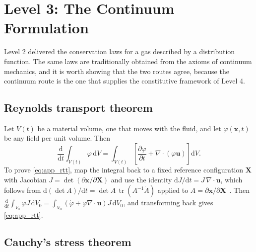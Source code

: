 \section{Level 3: The Continuum Formulation}
\label{app:continuum}

Level 2 delivered the conservation laws for a gas described by a distribution function. The same laws are traditionally obtained from the axioms of continuum mechanics, and it is worth showing that the two routes agree, because the continuum route is the one that supplies the constitutive framework of Level 4.

\subsection{Reynolds transport theorem}

Let $V(t)$ be a material volume, one that moves with the fluid, and let $\varphi(\mathbf{x},t)$ be any field per unit volume. Then
\begin{equation}
    \frac{\mathrm{d}}{\mathrm{d}t}\int_{V(t)}\varphi\,\mathrm{d}V = \int_{V(t)}\left[\frac{\partial\varphi}{\partial t} + \nabla\cdot(\varphi\mathbf{u})\right]\mathrm{d}V .
    \label{eq:app_rtt}
\end{equation}
To prove \eqref{eq:app_rtt}, map the integral back to a fixed reference configuration $\mathbf{X}$ with Jacobian $J = \det(\partial\mathbf{x}/\partial\mathbf{X})$ and use the identity $\mathrm{d}J/\mathrm{d}t = J\,\nabla\cdot\mathbf{u}$, which follows from $\mathrm{d}(\det A)/\mathrm{d}t = \det A\,\operatorname{tr}(A^{-1}\dot{A})$ applied to $A = \partial\mathbf{x}/\partial\mathbf{X}$~\cite{white2006viscous}. Then
$\frac{\mathrm{d}}{\mathrm{d}t}\int_{V_0}\varphi J\,\mathrm{d}V_0 = \int_{V_0}(\dot\varphi + \varphi\nabla\cdot\mathbf{u})J\,\mathrm{d}V_0$, and transforming back gives \eqref{eq:app_rtt}.

\subsection{Cauchy's stress theorem}

